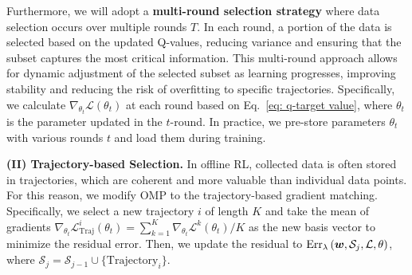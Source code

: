 Furthermore, we will adopt a \textbf{multi-round selection strategy} where data selection occurs over multiple rounds \( T \). In each round, a portion of the data is selected based on the updated Q-values, reducing variance and ensuring that the subset captures the most critical information. This multi-round approach allows for dynamic adjustment of the selected subset as learning progresses, improving stability and reducing the risk of overfitting to specific trajectories.
Specifically, we calculate $\nabla_{\theta_t}\mathcal L\left(\theta_t\right)$ at each round based on Eq.~\ref{eq: q-target value}, where $\theta_t$ is the parameter updated in the $t$-round.
In practice, we pre-store parameters $\theta_t$ with various rounds $t$ and load them during training.

\textbf{(II) Trajectory-based Selection.} 
In offline RL, collected data is often stored in trajectories, which are coherent and more valuable than individual data points.
For this reason, we modify OMP to the trajectory-based gradient matching.
Specifically, we select a new trajectory $i$ of length $K$ and take the mean of gradients $\nabla_{\theta_t}\mathcal L^i_{\text{Traj}}\left(\theta_t\right)=\sum_{k=1}^{K}\nabla_{\theta_t}\mathcal L^k\left(\theta_t\right)/K$  as the new basis vector to minimize the residual error.
Then, we update the residual to $\operatorname{Err}_{\lambda}\left({\bm{w}}, \mathcal{S}_{j}, \mathcal L, \theta\right)$, where $\mathcal{S}_j = \mathcal{S}_{j-1} \cup \{\text{Trajectory}_i\}$.






